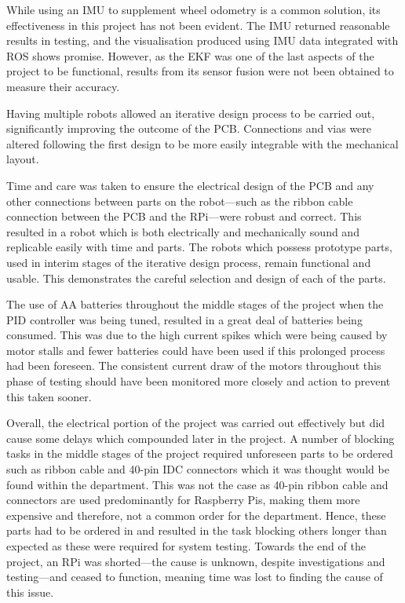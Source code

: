While using an IMU to supplement wheel odometry is a common solution, its
effectiveness in this project has not been evident. The IMU
returned reasonable results in testing, and the visualisation produced using
IMU data integrated with ROS shows promise. However, as the EKF was one of the last aspects of the project to be functional, results from its sensor fusion were not been obtained to
measure their accuracy.

Having multiple robots allowed an
iterative design process to be carried out, significantly improving the outcome
of the PCB. Connections and vias were altered following the first design to be
more easily integrable with the mechanical layout.

Time and care was taken to ensure the electrical design of the PCB and any other
connections between parts on the robot---such as the ribbon cable connection
between the PCB and the RPi---were robust and correct. This resulted
in a robot which is both electrically and mechanically sound and replicable
easily with time and parts. The robots which possess prototype parts, used in
interim stages of the iterative design process, remain functional and usable.
This demonstrates the careful selection and design of each of the parts.

The use of AA batteries throughout the middle stages of the project when the PID
controller was being tuned, resulted in a great deal of batteries being consumed.
This was due to the high current spikes which were being caused by motor stalls and
fewer batteries could have been used if this prolonged process had been foreseen. The
consistent current draw of the motors throughout this phase of testing should have
been monitored more closely and action to prevent this taken sooner.

Overall, the electrical portion of the project was carried out effectively but did
cause some delays which compounded later in the project. A number of
blocking tasks in the middle stages of the project required unforeseen parts to be
ordered such as ribbon cable and 40-pin IDC connectors which it was thought would
be found within the department. This was not the case as 40-pin ribbon cable and
connectors are used predominantly for Raspberry Pis, making them more expensive
and therefore, not a common order for the department. Hence, these parts had to be ordered in and resulted in the task blocking
others longer than expected as these were required for system testing. Towards the end of the project, an RPi was
shorted---the cause is unknown, despite investigations and testing---and ceased to function,
meaning time was lost to finding the cause of this issue.

